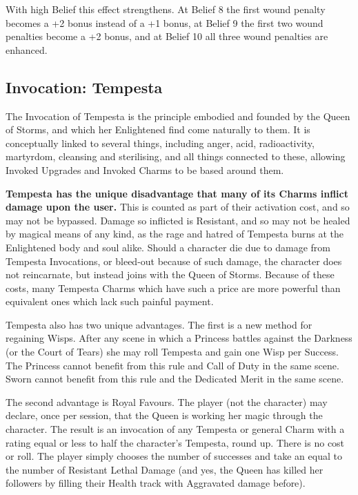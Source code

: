 With high Belief this effect strengthens. At Belief 8 the first wound penalty becomes a +2 bonus instead of a +1 bonus, at Belief 9 the first two wound penalties become a +2 bonus, and at Belief 10 all three wound penalties are enhanced. 

\subsection*{Invocation: Tempesta}

The Invocation of Tempesta is the principle embodied and founded by the Queen of Storms, and which her Enlightened find come naturally to them. It is conceptually linked to several things, including anger, acid, radioactivity, martyrdom, cleansing and sterilising, and all things connected to these, allowing Invoked Upgrades and Invoked Charms to be based around them.

\textbf{Tempesta has the unique disadvantage that many of its Charms inflict damage upon the user.} This is counted as part of their activation cost, and so may not be bypassed. Damage so inflicted is Resistant, and so may not be healed by magical means of any kind, as the rage and hatred of Tempesta burns at the Enlightened body and soul alike. Should a character die due to damage from Tempesta Invocations, or bleed-out because of such damage, the character does not reincarnate, but instead joins with the Queen of Storms. Because of these costs, many Tempesta Charms which have such a price are more powerful than equivalent ones which lack such painful payment.

Tempesta also has two unique advantages. The first is a new method for regaining Wisps. After any scene in which a Princess battles against the Darkness (or the Court of Tears) she may roll Tempesta and gain one Wisp per Success. The Princess cannot benefit from this rule and Call of Duty in the same scene. Sworn cannot benefit from this rule and the Dedicated Merit in the same scene. 

The second advantage is Royal Favours. The player (not the character) may declare, once per session, that the Queen is working her magic through the character. The result is an invocation of any Tempesta or general Charm with a rating equal or less to half the character's Tempesta, round up. There is no cost or roll. The player simply chooses the number of successes and take an equal to the number of Resistant Lethal Damage (and yes, the Queen has killed her followers by filling their Health track with Aggravated damage before). 


